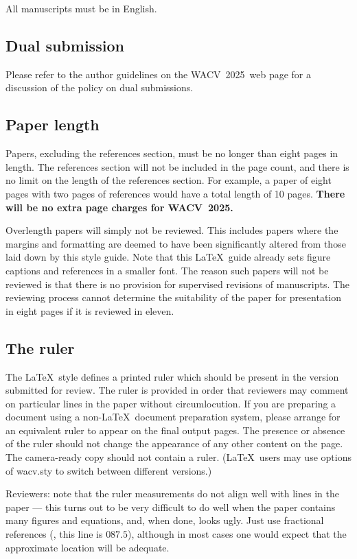 \documentclass[10pt,twocolumn,letterpaper]{article}
\def\confName{WACV}
\def\confYear{2025}
\begin{document}
All manuscripts must be in English.

\subsection{Dual submission}

Please refer to the author guidelines on the \confName\ \confYear\ web page for a
discussion of the policy on dual submissions.

\subsection{Paper length}
Papers, excluding the references section, must be no longer than eight pages in length.
The references section will not be included in the page count, and there is no limit on the length of the references section.
For example, a paper of eight pages with two pages of references would have a total length of 10 pages.
{\bf There will be no extra page charges for \confName\ \confYear.}

Overlength papers will simply not be reviewed.
This includes papers where the margins and formatting are deemed to have been significantly altered from those laid down by this style guide.
Note that this \LaTeX\ guide already sets figure captions and references in a smaller font.
The reason such papers will not be reviewed is that there is no provision for supervised revisions of manuscripts.
The reviewing process cannot determine the suitability of the paper for presentation in eight pages if it is reviewed in eleven.

\subsection{The ruler}
The \LaTeX\ style defines a printed ruler which should be present in the version submitted for review.
The ruler is provided in order that reviewers may comment on particular lines in the paper without circumlocution.
If you are preparing a document using a non-\LaTeX\ document preparation system, please arrange for an equivalent ruler to appear on the final output pages.
The presence or absence of the ruler should not change the appearance of any other content on the page.
The camera-ready copy should not contain a ruler.
(\LaTeX\ users may use options of wacv.sty to switch between different versions.)

Reviewers:
note that the ruler measurements do not align well with lines in the paper --- this turns out to be very difficult to do well when the paper contains many figures and equations, and, when done, looks ugly.
Just use fractional references (\eg, this line is $087.5$), although in most cases one would expect that the approximate location will be adequate.
\end{document}

